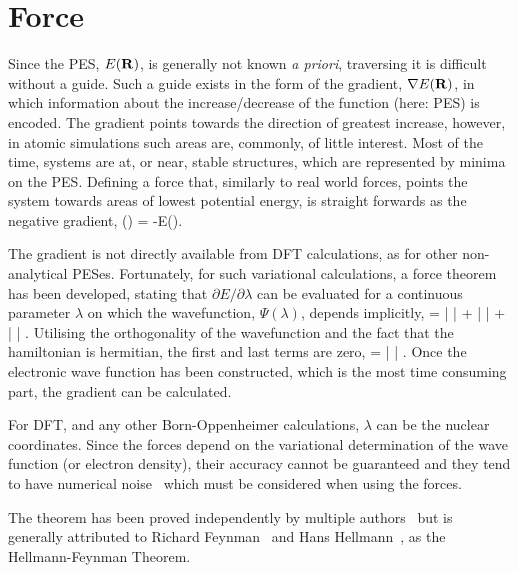 \section{Force}
\label{sec:force}
Since the PES, $E({\mathrm{\mathbf{\bm{R}}}})$, is generally not known \textit{a priori}, traversing it is difficult without a guide.
Such a guide exists in the form of the gradient, $\nabla E({\mathrm{\mathbf{\bm{R}}}})$, in which information about the increase/decrease of the function (here: PES) is encoded.
The gradient points towards the direction of greatest increase, however, in atomic simulations such areas are, commonly, of little interest.
Most of the time, systems are at, or near, stable structures, which are represented by minima on the PES.
Defining a force that, similarly to real world forces, points the system towards areas of lowest potential energy, is straight forwards as the negative gradient,
\vF(\vR) = -\nabla E(\vR).
\eeq

The gradient is not directly available from DFT calculations, as for other non-analytical PESes.
Fortunately, for such variational calculations, a force theorem has been developed, stating that $\partial E / \partial\lambda$ can be evaluated for a continuous parameter $\lambda$ on which the wavefunction, $\Psi(\lambda)$, depends implicitly,
 = 
\bra \frac{\partial \Psi}{\partial \lambda} |  | \Psi \ket +
\bra \Psi |  | \Psi \ket +
\bra \Psi |  | \frac{\partial \Psi}{\partial \lambda} \ket.
\eeq
Utilising the orthogonality of the wavefunction and the fact that the hamiltonian is hermitian, the first and last terms are zero, 
 = \bra \Psi |  | \Psi \ket.
\eeq
Once the electronic wave function has been constructed, which is the most time consuming part, the gradient can be calculated.

For DFT, and any other Born-Oppenheimer calculations, $\lambda$ can be the nuclear coordinates.
Since the forces depend on the variational determination of the wave function (or electron density), their accuracy cannot be guaranteed and they tend to have numerical noise~\cite{gpaw-2005} which must be considered when using the forces.

The theorem has been proved independently by multiple authors~\cite{forces-pauli-1933, forces-guttinger-1932} but is generally attributed to Richard Feynman~\cite{forces-feynman-1939} and Hans Hellmann~\cite{forces-hellmann-1937}, as the Hellmann-Feynman Theorem.
